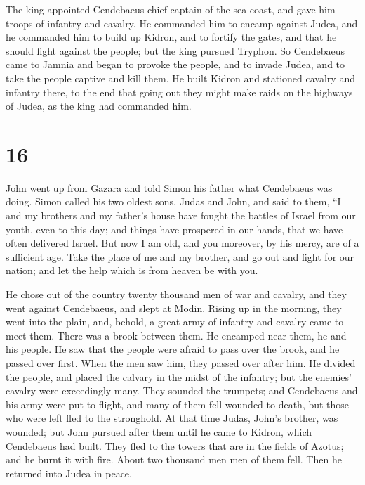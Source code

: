  The king appointed Cendebaeus chief captain of the sea
coast, and gave him troops of infantry and cavalry.  He
commanded him to encamp against Judea, and he commanded him to build up
Kidron, and to fortify the gates, and that he should fight against the
people; but the king pursued Tryphon.  So Cendebaeus came
to Jamnia and began to provoke the people, and to invade Judea, and to
take the people captive and kill them.  He built Kidron and
stationed cavalry and infantry there, to the end that going out they
might make raids on the highways of Judea, as the king had commanded
him.

\hypertarget{section-15}{%
\section{16}\label{section-15}}

 John went up from Gazara and told Simon his father what
Cendebaeus was doing.  Simon called his two oldest sons,
Judas and John, and said to them, ``I and my brothers and my father's
house have fought the battles of Israel from our youth, even to this
day; and things have prospered in our hands, that we have often
delivered Israel.  But now I am old, and you moreover, by
his mercy, are of a sufficient age. Take the place of me and my brother,
and go out and fight for our nation; and let the help which is from
heaven be with you.

 He chose out of the country twenty thousand men of war and
cavalry, and they went against Cendebaeus, and slept at Modin.
 Rising up in the morning, they went into the plain, and,
behold, a great army of infantry and cavalry came to meet them. There
was a brook between them.  He encamped near them, he and his
people. He saw that the people were afraid to pass over the brook, and
he passed over first. When the men saw him, they passed over after him.
 He divided the people, and placed the calvary in the midst
of the infantry; but the enemies' cavalry were exceedingly many.
 They sounded the trumpets; and Cendebaeus and his army were
put to flight, and many of them fell wounded to death, but those who
were left fled to the stronghold.  At that time Judas,
John's brother, was wounded; but John pursued after them until he came
to Kidron, which Cendebaeus had built.  They fled to the
towers that are in the fields of Azotus; and he burnt it with fire.
About two thousand men men of them fell. Then he returned into Judea in
peace.

